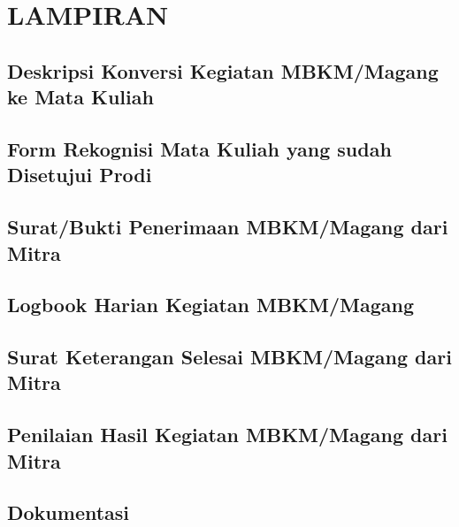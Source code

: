 \appendix
\chapter*{LAMPIRAN}
\setcounter{section}{0} %
\setcounter{page}{1}

\renewcommand{\thesection}{\Alph{section}}
\renewcommand{\thesubsection}{\Alph{section}.\arabic{subsection}\hspace{-0.25cm}}
\renewcommand{\thepage}{L - \arabic{page}}

\section{Deskripsi Konversi Kegiatan MBKM/Magang ke Mata Kuliah}


\newpage
\section{Form Rekognisi Mata Kuliah yang sudah Disetujui Prodi}

\newpage
\section{Surat/Bukti Penerimaan MBKM/Magang dari Mitra}

\newpage
\section{Logbook Harian Kegiatan MBKM/Magang}


\newpage
\section{Surat Keterangan Selesai MBKM/Magang dari Mitra}

\newpage
\section{Penilaian Hasil Kegiatan MBKM/Magang dari Mitra}


\newpage
\section{Dokumentasi}
